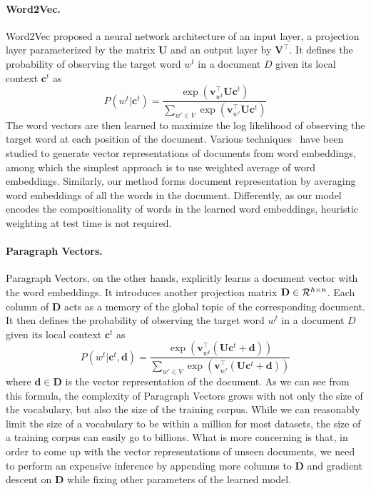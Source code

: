\documentclass{article} \usepackage{iclr2017_conference,times}
\newcommand{\vl}{\mathbf{v}}
\newcommand{\cl}{\mathbf{c}}
\newcommand{\dl}{\mathbf{d}}
\newcommand{\uul}{\mathbf{U}}
\newcommand{\vvl}{\mathbf{V}}
\newcommand{\ddl}{\mathbf{D}}
\begin{document}
\paragraph{Word2Vec.}
\label{sec:word2vec}
Word2Vec proposed a neural network architecture of an input layer, a projection layer parameterized by the matrix $\uul$ and an output layer by $\vvl^\top$. It defines the probability of observing the target word $w^t$ in a document $D$ given its local context $\cl^t$ as 
$$P(w^t|\cl^t) = \frac{\exp(\vl_{w^t}^\top \uul \cl^t)}{\sum_{w' \in V}\exp(\vl_{w'}^\top \uul \cl^t)}$$
The word vectors are then learned to maximize the log likelihood of observing the target word at each position of the document. Various techniques~\citep{mitchell2010composition, zanzotto2010estimating, yessenalina2011compositional, grefenstette2013multi, socher2013recursive,kusner2015word}  have been studied to generate vector representations of documents from word embeddings, among which the simplest approach is to use weighted average of word embeddings. Similarly, our method forms document representation by averaging word embeddings of all the words in the document. Differently, as our model encodes the compositionality of words in the learned word embeddings, heuristic weighting at test time is not required.


\paragraph{Paragraph Vectors.}
\label{sec:doc2vec}
Paragraph Vectors, on the other hands, explicitly learns a document vector with the word embeddings. It introduces another projection matrix $\ddl \in {\cal R}^{h\times n}$. Each column of $\ddl$ acts as a memory of the global topic of the corresponding document. It then defines the probability of observing the target word $w^t$ in a document $D$ given its local context $\cl^t$ as
$$P(w^t|\cl^t, \dl) = \frac{\exp(\vl_{w^t}^\top (\uul \cl^t + \dl))}{\sum_{w' \in V}\exp(\vl_{w'}^\top (\uul \cl^t + \dl))}$$
where $\dl \in \ddl$ is the vector representation of the document.  As we can see from this formula, the complexity of Paragraph Vectors grows with not only the size of the vocabulary, but also the size of the training corpus. While we can reasonably limit the size of a vocabulary to be within a million for most datasets, the size of a training corpus can easily go to billions. What is more concerning is that, in order to come up with the vector representations of unseen documents, we need to perform an expensive inference by appending more columns to $\ddl$ and gradient descent on $\ddl$ while fixing other parameters of the learned model. 
\end{document}
